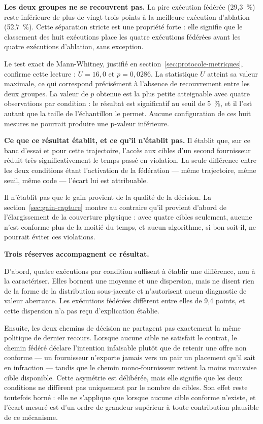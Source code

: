 \textbf{Les deux groupes ne se recouvrent pas.} La pire exécution fédérée (29,3~\%) reste inférieure de plus de vingt-trois points à la meilleure exécution d'ablation (52,7~\%). Cette séparation stricte est une propriété forte : elle signifie que le classement des huit exécutions place les quatre exécutions fédérées avant les quatre exécutions d'ablation, sans exception.

Le test exact de Mann-Whitney, justifié en section~\ref{sec:protocole-metriques}, confirme cette lecture : $U = 16{,}0$ et $p = 0{,}0286$. La statistique $U$ atteint sa valeur maximale, ce qui correspond précisément à l'absence de recouvrement entre les deux groupes. La valeur de $p$ obtenue est la plus petite atteignable avec quatre observations par condition : le résultat est significatif au seuil de 5~\%, et il l'est autant que la taille de l'échantillon le permet. Aucune configuration de ces huit mesures ne pourrait produire une p-valeur inférieure.

\textbf{Ce que ce résultat établit, et ce qu'il n'établit pas.} Il établit que, sur ce banc d'essai et pour cette trajectoire, l'accès aux cibles d'un second fournisseur réduit très significativement le temps passé en violation. La seule différence entre les deux conditions étant l'activation de la fédération — même trajectoire, même seuil, même code — l'écart lui est attribuable.

Il n'établit pas que le gain provient de la qualité de la décision. La section~\ref{sec:gain-capture} montre au contraire qu'il provient d'abord de l'élargissement de la couverture physique : avec quatre cibles seulement, aucune n'est conforme plus de la moitié du temps, et aucun algorithme, si bon soit-il, ne pourrait éviter ces violations.

\textbf{Trois réserves accompagnent ce résultat.}

D'abord, quatre exécutions par condition suffisent à établir une différence, non à la caractériser. Elles bornent une moyenne et une dispersion, mais ne disent rien de la forme de la distribution sous-jacente et n'autorisent aucun diagnostic de valeur aberrante. Les exécutions fédérées diffèrent entre elles de 9,4 points, et cette dispersion n'a pas reçu d'explication établie.

Ensuite, les deux chemins de décision ne partagent pas exactement la même politique de dernier recours. Lorsque aucune cible ne satisfait le contrat, le chemin fédéré déclare l'intention infaisable plutôt que de retenir une offre non conforme — un fournisseur n'exporte jamais vers un pair un placement qu'il sait en infraction — tandis que le chemin mono-fournisseur retient la moins mauvaise cible disponible. Cette asymétrie est délibérée, mais elle signifie que les deux conditions ne diffèrent pas uniquement par le nombre de cibles. Son effet reste toutefois borné : elle ne s'applique que lorsque aucune cible conforme n'existe, et l'écart mesuré est d'un ordre de grandeur supérieur à toute contribution plausible de ce mécanisme.

